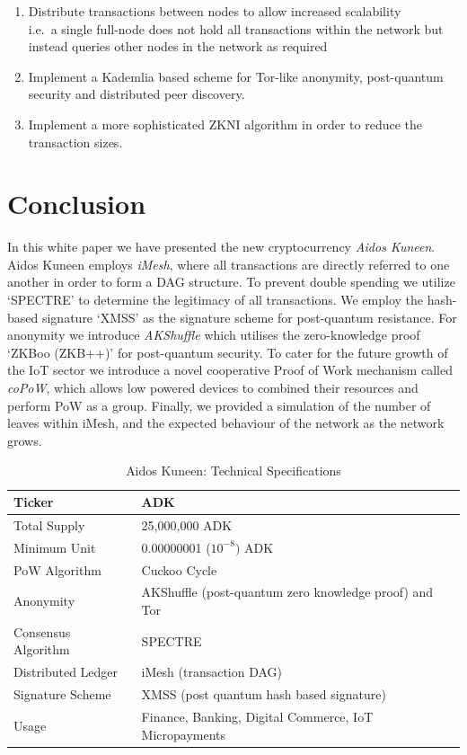 \documentclass[a4paper,10pt,twocolumn]{article}
\begin{document}
	\vspace{-0.5\baselineskip}
	\begin{enumerate}
		\setlength\itemsep{0em}
	\item  Distribute transactions between nodes to allow increased scalability\\
	i.e.\ a single full-node does not hold all transactions 
	 within the network but instead queries other nodes in the network as required
	\item Implement a Kademlia based scheme for Tor-like anonymity, post-quantum security and distributed peer discovery.
	\item Implement a more sophisticated ZKNI algorithm in order to reduce the transaction sizes.
	\end{enumerate}

	  \section{Conclusion}
\label{sec:conc}

In this white paper we have presented the new cryptocurrency \emph{Aidos Kuneen}.
Aidos Kuneen employs \emph{iMesh}, where all transactions are directly referred to one another in order to form a DAG structure.
To prevent double spending we utilize `SPECTRE' to determine the legitimacy of all transactions.
We employ the hash-based signature `XMSS' as the signature scheme for post-quantum resistance.
For anonymity we introduce \emph{AKShuffle} which utilises the zero-knowledge proof `ZKBoo (ZKB++)' for post-quantum security.
To cater for the future growth of the IoT sector we introduce a novel cooperative Proof of Work mechanism called \emph{coPoW}, which allows low powered devices to combined their resources and perform PoW as a group.
Finally, we provided a simulation of the number of leaves within iMesh, and the expected behaviour of the network as the network grows.

\begin{table}[htb]
	\caption{Aidos Kuneen: Technical Specifications}
    \label{tbl:spec}
	\begin{tabularx}{\linewidth}{XX} 
		\toprule
		Ticker & ADK \\
		\midrule
Total Supply & 25,000,000 ADK \\ 
\midrule
Minimum Unit & 0.00000001 (\(10^{-8})\) ADK \\ 
\midrule
PoW Algorithm & Cuckoo Cycle\\ 
\midrule
Anonymity & AKShuffle (post-quantum zero knowledge proof) and Tor \\
\midrule
Consensus Algorithm & SPECTRE \\ \midrule
Distributed Ledger & iMesh (transaction DAG) \\
\midrule
Signature Scheme & XMSS (post quantum hash based signature)\\ 
\midrule
Usage &  Finance, Banking, Digital Commerce, IoT Micropayments \\ 
\bottomrule
\end{tabularx}
  \end{table}
\end{document}
